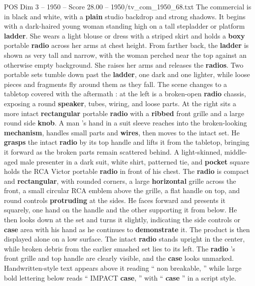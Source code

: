 \begin{textsample}{POS Dim 3 – 1950 – Score 28.00 – 1950/tv\_com\_1950\_68.txt}  \label{ex:f3_pos_002}
The commercial is in black and white, with a \textbf{plain} studio backdrop and strong shadows.
It begins with a dark-haired young woman standing high on a tall stepladder or platform \textbf{ladder}.
She wears a light blouse or dress with a striped skirt and holds a \textbf{boxy} portable \textbf{radio} across her arms at chest height.
From farther back, the \textbf{ladder} is shown as very tall and narrow, with the woman perched near the top against an otherwise empty background.
She raises her arms and releases the \textbf{radios}.
Two portable sets tumble down past the \textbf{ladder}, one dark and one lighter, while loose pieces and fragments fly around them as they fall.
The scene changes to a tabletop covered with the aftermath : at the left is a broken-open \textbf{radio} chassis, exposing a round \textbf{speaker}, tubes, wiring, and loose parts.
At the right sits a more intact \textbf{rectangular} portable \textbf{radio} with a \textbf{ribbed} front grille and a large round side \textbf{knob}.
A man ’s hand in a suit sleeve reaches into the broken-looking \textbf{mechanism}, handles small parts and \textbf{wires}, then moves to the intact set.
He \textbf{grasps} the intact \textbf{radio} by its top handle and lifts it from the tabletop, bringing it forward as the broken parts remain scattered behind.
A light-skinned, middle-aged male presenter in a dark suit, white shirt, patterned tie, and \textbf{pocket} square holds the RCA Victor portable \textbf{radio} in front of his chest.
The \textbf{radio} is compact and \textbf{rectangular}, with rounded corners, a large \textbf{horizontal} grille across the front, a small circular RCA emblem above the grille, a flat handle on top, and round controls \textbf{protruding} at the sides.
He faces forward and presents it squarely, one hand on the handle and the other supporting it from below.
He then looks down at the set and turns it slightly, indicating the side controls or \textbf{case} area with his hand as he continues to \textbf{demonstrate} it.
The product is then displayed alone on a low surface.
The intact \textbf{radio} stands upright in the center, while broken debris from the earlier smashed set lies to its left.
The \textbf{radio} ’s front grille and top handle are clearly visible, and the \textbf{case} looks unmarked.
Handwritten-style text appears above it reading “ non breakable, ” while large bold lettering below reads “ IMPACT \textbf{case}, ” with “ \textbf{case} ” in a script style.

\end{textsample}
